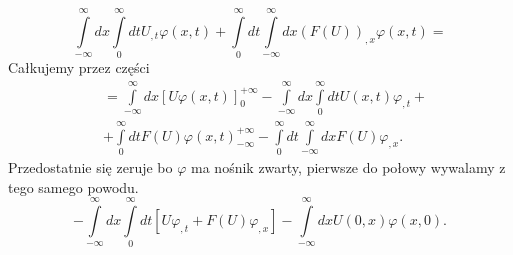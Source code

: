 \documentclass[../main.tex]{subfiles}
\begin{document}
\[
    \int\limits_{-\infty}^{\infty} dx \int\limits_{0}^{\infty} dt U_{,t}\varphi(x,t) + \int\limits_{0}^{\infty} dt \int\limits_{-\infty}^{\infty} dx \left( F(U) \right)_{,x} \varphi(x,t)=
\]
Całkujemy przez części
\begin{align*}
    &= \int\limits_{-\infty}^{\infty} dx \left[ U \varphi(x,t) \right]_0^{+\infty} - \int\limits_{-\infty}^{\infty} dx \int\limits_{0}^{\infty} dt U(x,t)\varphi_{,t} +\\
    &+ \int\limits_{0}^{\infty} dt F(U)\varphi(x,t)_{-\infty}^{+\infty} - \int\limits_{0}^{\infty} dt \int\limits_{-\infty}^{\infty}dx  F(U)\varphi_{,x}
.\end{align*}
Przedostatnie się zeruje bo $\varphi$ ma nośnik zwarty, pierwsze do połowy wywalamy z tego samego powodu.
\[
    - \int\limits_{-\infty}^{\infty} dx \int\limits_{0}^{\infty} dt \left[ U\varphi_{,t}+F(U)\varphi_{,x} \right] - \int\limits_{-\infty}^{\infty} dx U(0, x)\varphi(x,0)
.\]
\end{document}
